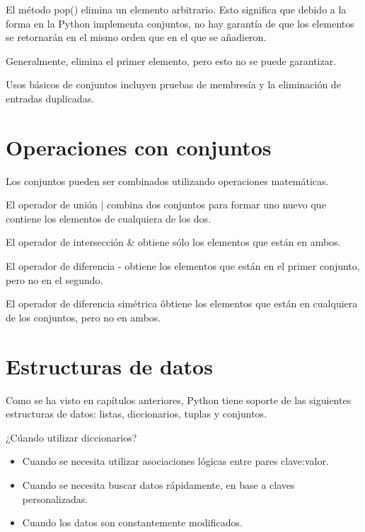 \documentclass{report}
\begin{document}

El método pop() elimina un elemento arbitrario. Esto significa que debido a la forma en la Python implementa conjuntos, no hay garantía de que los elementos se retornarán en el mismo orden que en el que se añadieron.

Generalmente, elimina el primer elemento, pero esto no se puede garantizar.


Usos básicos de conjuntos incluyen pruebas de membresía y la eliminación de entradas duplicadas.

\section{Operaciones con conjuntos}

Los conjuntos pueden ser combinados utilizando operaciones matemáticas.

El operador de unión | combina dos conjuntos para formar uno nuevo que contiene los elementos de cualquiera de los dos.


El operador de intersección \& obtiene sólo los elementos que están en ambos.


El operador de diferencia - obtiene los elementos que están en el primer conjunto, pero no en el segundo.


El operador de diferencia simétrica \^ obtiene los elementos que están en cualquiera de los conjuntos, pero no en ambos.


\section{Estructuras de datos}


Como se ha visto en capítulos anteriores, Python tiene soporte de las siguientes estructuras de datos: listas, diccionarios, tuplas y conjuntos.

¿Cúando utilizar diccionarios?

\begin{itemize}
  \item Cuando se necesita utilizar asociaciones lógicas entre pares clave:valor.
  \item Cuando se necesita buscar datos rápidamente, en base a claves personalizadas.
  \item Cuando los datos son constantemente modificados.
\end{itemize}
\end{document}
